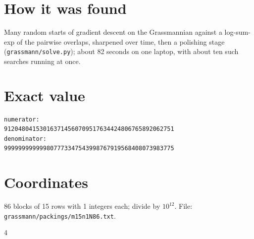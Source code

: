 \documentclass[11pt,a4paper]{article}
\begin{document}
\section{How it was found}
Many random starts of gradient descent on the Grassmannian against a log-sum-exp of the pairwise overlaps, sharpened over time, then a polishing stage (\texttt{grassmann/solve.py}); about 82 seconds on one laptop, with about ten such searches running at once.


\appendix
\section{Exact value}
{\small
\begin{verbatim}
numerator:
912048041530163714560709517634424806765892062751
denominator:
999999999999807773347543998767919568408073983775
\end{verbatim}}

\section{Coordinates}
86 blocks of 15 rows with 1 integers each; divide by $10^{12}$. File: \texttt{grassmann/packings/m15n1N86.txt}.
{\tiny
\begin{multicols}{4}
\end{multicols}}
\end{document}
